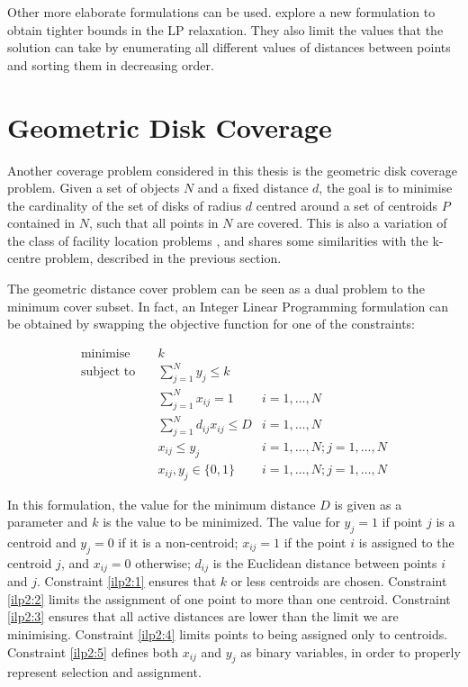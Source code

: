 Other more elaborate formulations can be used. \citet{linearprog} explore a new formulation to obtain tighter bounds in the LP relaxation. They also limit the values that the solution can take by enumerating all different values of distances between points and sorting them in decreasing order.

\section{Geometric Disk Coverage}
\label{ilp2}
Another coverage problem considered in this thesis is the geometric disk coverage problem. Given a set of objects $N$ and a fixed distance $d$, the goal is to minimise the cardinality of the set of disks of radius $d$ centred around a set of centroids $P$ contained in $N$, such that all points in $N$ are covered. This is also a variation of the class of facility location problems \cite{thisfref}, and shares some similarities with the k-centre problem, described in the previous section.

The geometric distance cover problem can be seen as a dual problem to the minimum cover subset. In fact, an Integer Linear Programming formulation can be obtained by swapping the objective function for one of the constraints:

\begin{align}
\text{minimise}   \quad& k							   &\\
\text{subject to} \quad
& \sum\limits_{j=1}^{N}{y_j} \leq k 
& 							\label{ilp2:1}\\
& \sum\limits_{j=1}^{N}{x_{ij}}	= 1   
& i=1,\ldots,N 				\label{ilp2:2}\\
& \sum\limits_{j=1}^{N}{d_{ij} x_{ij}} \leq D
& i=1,\ldots,N				\label{ilp2:3}\\
& x_{ij} \leq y_{j}				   
& i=1,\ldots,N;j=1,\ldots,N	\label{ilp2:4}\\
& x_{ij},y_{j} \in \{0,1\}
& i=1,\ldots,N;j=1,\ldots,N \label{ilp2:5}
\end{align}

In this formulation, the value for the minimum distance $D$ is given as a parameter and $k$ is the value to be minimized. The value for $y_j = 1$ if point $j$ is a centroid and $y_j = 0$ if it is a non-centroid;
$x_{ij} = 1$ if the point $i$ is assigned to the centroid $j$, and $x_{ij}=0$ otherwise;
$d_{ij}$ is the Euclidean distance between points $i$ and $j$.
Constraint \eqref{ilp2:1} ensures that $k$ or less centroids are chosen.
Constraint \eqref{ilp2:2} limits the assignment of one point to more than one centroid.
Constraint \eqref{ilp2:3} ensures that all active distances are lower than the limit we are minimising.
Constraint \eqref{ilp2:4} limits points to being assigned only to centroids.
Constraint \eqref{ilp2:5} defines both $x_{ij}$ and $y_j$ as binary variables, in order to properly represent selection and assignment.

